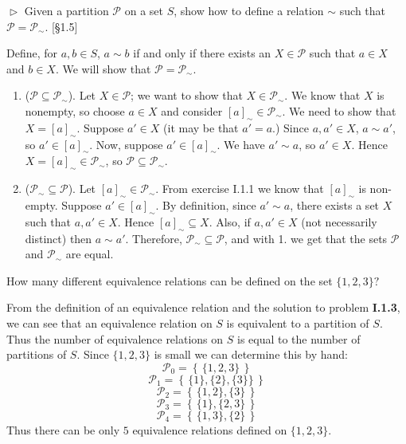 \documentclass[12pt,letterpaper,boxed]{hmcpset}
\newcommand{\set}[1]{\left\{\,#1\,\right\}}
\begin{document}
\begin{problem}[1.3]
	$\vartriangleright$ Given a partition $\mathscr{P}$ on a set $S$, show how to define a
	relation $\sim$ such that $\mathscr{P} = \mathscr{P}_{\sim}$. [\S1.5]
\end{problem}

\begin{solution}
	Define, for $a,b\in S$, $a\sim b$ if and only if there exists
	an $X\in\mathscr{P}$ such that $a\in X$ and $b\in X$. We will show that
	$\mathscr{P} = \mathscr{P}_{\sim}$. 
	
	\begin{enumerate}
		\item ($\mathscr{P}\subseteq\mathscr{P}_{\sim}$). Let $X\in \mathscr{P}$; we want to
		show that $X\in\mathscr{P}_{\sim}$. We know that $X$ is
		nonempty, so choose $a\in X$ and consider $[a]_{\sim}\in\mathscr{P}_{\sim}$. We
		need to show that $X=[a]_{\sim}$. Suppose $a'\in X$ (it may be that $a'=a$.)
		Since $a,a'\in X$, $a\sim a'$, so $a'\in[a]_{\sim}$. Now, suppose $a'\in
		[a]_{\sim}$. We have $a'\sim a$, so $a'\in X$. Hence $X=[a]_{\sim}\in
		\mathscr{P}_{\sim}$, so $\mathscr{P}\subseteq\mathscr{P}_{\sim}$.
		
		\item ($\mathscr{P}_{\sim}\subseteq\mathscr{P}$). Let $[a]_{\sim}\in\mathscr{P}_{\sim}$.
		From exercise I.1.1 we know that $[a]_{\sim}$ is non-empty. Suppose
		$a'\in[a]_{\sim}$. By definition, since $a'\sim a$, there exists a set $X$ such
		that $a,a'\in X$. Hence $[a]_{\sim}\subseteq X$. Also, if $a,a'\in X$ (not
		necessarily distinct) then $a\sim a'$. Therefore,
		$\mathscr{P}_{\sim}\subseteq\mathscr{P}$, and with 1. we get that the sets
		$\mathscr{P}$ and $\mathscr{P}_{\sim}$ are equal.
	\end{enumerate}
\end{solution}


\begin{problem}[1.4]
	How many different equivalence relations can be defined on the set $\{1,2,3\}?$
\end{problem}

\begin{solution}
	From the definition of an equivalence relation and the solution to problem
	\textbf{I.1.3}, we can see that an equivalence relation on $S$ is equivalent to
	a partition of $S$. Thus the number of equivalence relations on $S$ is equal to
	the number of partitions of $S$. Since $\{1,2,3\}$ is small we can determine
	this by hand:
	\[ \mathscr{P}_0 = \set{\{1,2,3\}} \]
	\[ \mathscr{P}_1 = \set{\{1\},\{2\},\{3\}\}} \]
	\[ \mathscr{P}_2 = \set{\{1,2\},\{3\}} \]
	\[ \mathscr{P}_3 = \set{\{1\},\{2,3\}} \]
	\[ \mathscr{P}_4 = \set{\{1,3\},\{2\}} \]
	Thus there can be only $5$ equivalence relations defined on $\{1,2,3\}$.
\end{solution}
\end{document}
